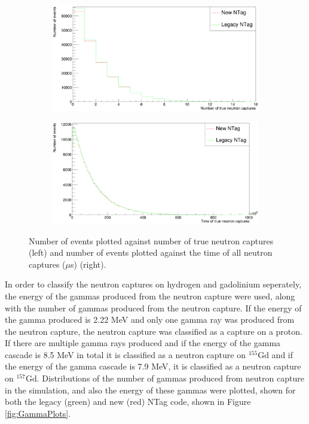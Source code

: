 \begin{figure}
    \centering
     \begin{subfigure}[b]{0.49\linewidth}
      \includegraphics[width=\linewidth]{Figures/NTrueCaptures.PNG}
     \end{subfigure}
     \begin{subfigure}[b]{0.49\linewidth}
       \includegraphics[width=\linewidth]{Figures/TrueCaptureTime.PNG}
      \end{subfigure} 
      \caption{Number of events plotted against number of true neutron captures (left) and number of events plotted against the time of all neutron captures ($\mu$s) (right). }
      \label{fig:NCapTime}
\end{figure}

In order to classify the neutron captures on hydrogen and gadolinium seperately, the energy of the gammas produced from the neutron capture were used, along with the number of gammas produced from the neutron capture. If the energy of the gamma produced is 2.22 MeV and only one gamma ray was produced from the neutron capture, the neutron capture was classified as a capture on a proton. If there are multiple gamma rays produced and if the energy of the gamma cascade is 8.5 MeV in total it is classified as a neutron capture on ${ }^{155} \mathrm{Gd}$ and if the energy of the gamma cascade is 7.9 MeV, it is classified as a neutron capture on ${ }^{157} \mathrm{Gd}$. Distributions of the number of gammas produced from neutron capture in the simulation, and also the energy of these gammas were plotted, shown for both the legacy (green) and new (red) NTag code, shown in Figure \ref{fig:GammaPlots}. 

